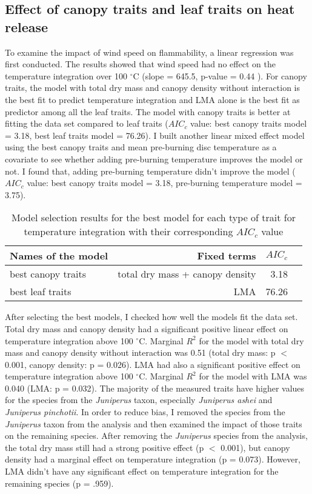 \documentclass[12pt]{report}
\begin{document}
\subsection{Effect of canopy traits and leaf traits on heat release}
To examine the impact of wind speed on flammability, a linear regression was first conducted. The results showed that wind speed had no effect on the temperature integration over 100 $^{\circ}$C  (slope = 645.5, p-value = 0.44 ). For canopy traits, the model with total dry mass and canopy density without interaction is the best fit to predict temperature integration and \MakeUppercase{lma} alone is the best fit as predictor among all the leaf traits. The model with canopy traits is better at fitting the data set compared to leaf traits ($AIC_{c}$ value: best canopy traits model = 3.18, best leaf traits model = 76.26). I built another linear mixed effect model using the best canopy traits and mean pre-burning disc temperature as a covariate to see whether adding pre-burning temperature improves the model or not. I found that, adding pre-burning temperature didn't improve the model ($AIC_{c}$ value: best canopy traits model = 3.18, pre-burning temperature model = 3.75).


\begin{table}
\centering
\begin{tabular}{lrrr}
       \hline
       \textbf{ Names of the model} & \textbf{ Fixed terms} & \textbf{$AIC_{c}$} \\
       \hline
        best canopy traits  & total dry mass + canopy density &  3.18 \\
       \hline
        best leaf traits    & LMA & 76.26 \\
       \hline
\end{tabular}
\caption{Model selection results for the best model for each type of trait for temperature integration with their corresponding $AIC_{c}$ value}
\end{table} 



After selecting the best models, I checked how well the models fit the data set. Total dry mass and canopy density had a significant positive linear effect on temperature integration above 100 $^{\circ}$C. Marginal $R^2$ for the model with total dry mass and canopy density without interaction was 0.51 (total dry mass: p $<$ 0.001, canopy density: p = 0.026). LMA had also a significant positive effect on temperature integration above 100 $^{\circ}$C. Marginal $R^2$ for the model with LMA was 0.040 (LMA: p = 0.032). The majority of the measured traits have higher values for the species from the \emph{Juniperus} taxon, especially \emph{Juniperus ashei} and \emph{Juniperus pinchotii}. In order to reduce bias, I removed the species from the \emph{Juniperus} taxon from the analysis and then examined the impact of those traits on the remaining species. After removing the \emph{Juniperus} species from the analysis, the total dry mass still had a strong positive effect (p $<$ 0.001), but canopy density had a marginal effect on temperature integration (p = 0.073). However, LMA didn't have any significant effect on temperature integration for the remaining species (p = .959).
\end{document}
